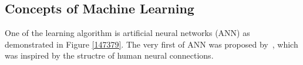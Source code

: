 \subsection{Concepts of Machine Learning}
One of the learning algorithm is artificial neural networks (ANN) as demonstrated in Figure \ref{147379}. The very first of ANN was proposed by~\citet{McCulloch_1943}, which was inspired by the structre of human neural connections. 